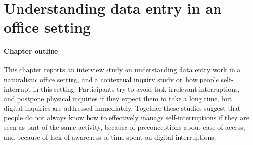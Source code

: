\chapter{Understanding data entry in an office setting}\label{ch:12}
\begin{mynote}
\subsubsection{Chapter outline}

This chapter reports an interview study on understanding data entry work in a naturalistic office setting, and a contextual inquiry study on how people self-interrupt in this setting. Participants try to avoid task-irrelevant interruptions, and postpone physical inquiries if they expect them to take a long time, but digital inquiries are addressed immediately. Together these studies suggest that people do not always know how to effectively manage self-interruptions if they are seen as part of the same activity, because of preconceptions about ease of access, and because of lack of awareness of time spent on digital interruptions.

\end{mynote}

